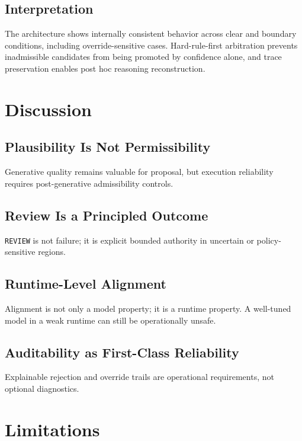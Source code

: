 \documentclass[11pt,a4paper]{article}
\begin{document}
\subsection{Interpretation}
The architecture shows internally consistent behavior across clear and boundary conditions, including override-sensitive cases. Hard-rule-first arbitration prevents inadmissible candidates from being promoted by confidence alone, and trace preservation enables post hoc reasoning reconstruction.

\section{Discussion}

\subsection{Plausibility Is Not Permissibility}
Generative quality remains valuable for proposal, but execution reliability requires post-generative admissibility controls.

\subsection{Review Is a Principled Outcome}
\texttt{REVIEW} is not failure; it is explicit bounded authority in uncertain or policy-sensitive regions.

\subsection{Runtime-Level Alignment}
Alignment is not only a model property; it is a runtime property. A well-tuned model in a weak runtime can still be operationally unsafe.

\subsection{Auditability as First-Class Reliability}
Explainable rejection and override trails are operational requirements, not optional diagnostics.

\section{Limitations}
\end{document}
